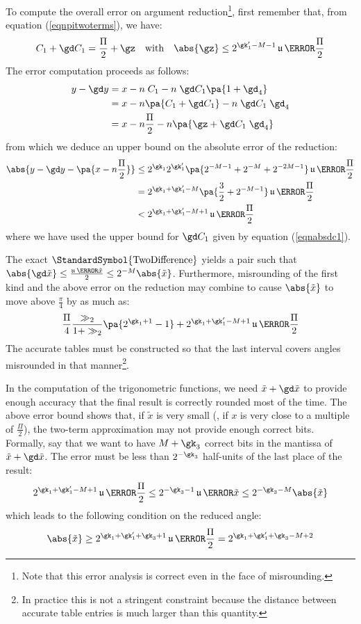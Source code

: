 \documentclass[10pt, a4paper, twoside]{basestyle}
\DeclareMathOperator{\ULP}{\mathfrak u}
\DeclareMathOperator{\twodifference}{\StandardSymbol{TwoDifference}}
\newcommand{\red}[1]{\tilde{#1}}
\begin{document}
To compute the overall error on argument reduction\footnote{Note that this error analysis is correct even in the face of misrounding.}, first remember that, from equation (\ref{eqnpitwoterms}), we have:
\[
C_1 + \gd C_1 = \frac{\Pi}{2} + \gz \quad \text{with} \quad \abs{\gz} \leq 2^{\gk'_1 - M - 1} \ULP\of{\frac{\Pi}{2}}
\]
The error computation proceeds as follows:
\begin{align*}
y - \gd y &= x - n \; C_1 - n \; \gd C_1 \pa{1 + \gd_4} \\
&= x - n \pa{C_1 + \gd C_1} - n \; \gd C_1 \; \gd_4 \\
&= x - n \frac{\Pi}{2} - n \pa{\gz + \gd C_1 \; \gd_4}
\end{align*}
from which we deduce an upper bound on the absolute error of the reduction:
\begin{align*}
\abs{y - \gd y - \pa{x - n \frac{\Pi}{2}}} &\leq 2^{\gk_1} 2^{\gk'_1} \pa{2^{- M - 1} + 2^{-M} + 2^{-2 M - 1}} \ULP\of{\frac{\Pi}{2}} \\
&= 2^{\gk_1 + \gk'_1 - M}\pa{\frac{3}{2} + 2^{-M - 1}} \ULP\of{\frac{\Pi}{2}} \\
&< 2^{\gk_1 + \gk'_1 - M + 1} \ULP\of{\frac{\Pi}{2}}
\end{align*}
where we have used the upper bound for $\gd C_1$ given by equation (\ref{eqnabsdc1}).

The exact $\twodifference$ yields a pair such that $\abs{\gd \red x} \le \frac{\ULP\of{\red x}}{2} \le 2^{-M} \abs{\red x}$.  Furthermore, misrounding of the first kind and the above error on the reduction may combine to cause $\abs{\red x}$ to move above $\frac{\pi}{4}$ by as much as:
\[
\frac{\Pi}{4} \frac{\gg_2}{1 + \gg_2} \pa{2^{\gk_1 + 1} - 1} + 2^{\gk_1 + \gk'_1 - M + 1} \ULP\of{\frac{\Pi}{2}}
\]
The accurate tables must be constructed so that the last interval covers angles misrounded in that manner\footnote{In practice this is not a stringent constraint because the distance between accurate table entries is much larger than this quantity.}.

In the computation of the trigonometric functions, we need $\red x + \gd \red x$ to provide enough accuracy that the final result is correctly rounded most of the time.  The above error bound shows that, if $\red x$ is very small (\idest, if $x$ is very close to a multiple of $\frac{\Pi}{2}$), the two-term approximation may not provide enough correct bits.  Formally, say that we want to have $M + \gk_3$ correct bits in the mantissa of $\red x + \gd \red x$.  The error must be less than $2^{-\gk_3}$ half-units of the last place of the result:
\begin{equation}
2^{\gk_1 + \gk'_1 - M + 1} \ULP\of{\frac{\Pi}{2}} \leq 2^{-\gk_3 - 1} \ULP\of{\red x} \leq 2^{-\gk_3 - M} \abs{\red x}
\label{eqnreductionbound}
\end{equation}
which leads to the following condition on the reduced angle:
\[
\abs{\red x} \geq 2^{\gk_1 + \gk'_1 + \gk_3 + 1} \ULP\of{\frac{\Pi}{2}} = 2^{\gk_1 + \gk'_1 + \gk_3 - M + 2}
\]
\end{document}
